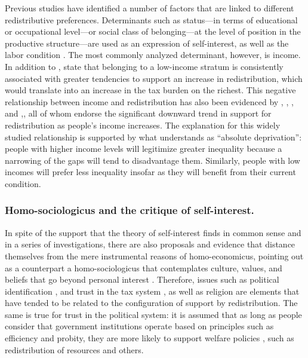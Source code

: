\documentclass[utf8]{frontiersSCNS} %
\begin{document}
Previous studies have identified a number of factors that are linked to different redistributive preferences. Determinants such as status—in terms of educational or occupational level—or social class of belonging—at the level of position in the productive structure—are used as an expression of self-interest, as well as the labor condition \parencite{GijsbertsLegitimationIncomeInequality2002}. The most commonly analyzed determinant, however, is income. In addition to \textcite{MeltzerRationalTheorySize1981}, \textcite{FrankoInequalitySelfInterestPublic2013} state that belonging to a low-income stratum is consistently associated with greater tendencies to support an increase in redistribution, which would translate into an increase in the tax burden on the richest. This negative relationship between income and redistribution has also been evidenced by \textcite{BernasconiRedistributivetaxationdemocracies2006}, \textcite{IversenCapitalismDemocracyWelfare2005}, \textcite{JaegerWelfarestateregimes2005, JaegerWelfareRegimesAttitudes2006}, and \textcite{FinseraasIncomeInequalityDemand2009},, all of whom endorse the significant downward trend in support for redistribution as people’s income increases. The explanation for this widely studied relationship is supported by what \textcite{SzirmaiInequalityobserved1986} understands as “absolute deprivation”: people with higher income levels will legitimize greater inequality because a narrowing of the gaps will tend to disadvantage them. Similarly, people with low incomes will prefer less inequality insofar as they will benefit from their current condition.

\subsubsection{Homo-sociologicus and the critique of self-interest.}

In spite of the support that the theory of self-interest finds in common sense and in a series of investigations, there are also proposals and evidence that distance themselves from the mere instrumental reasons of homo-economicus, pointing out as a counterpart a homo-sociologicus that contemplates culture, values, and beliefs that go beyond personal interest \parencite{etzioni1988moral, FeldmanPoliticalCultureAmbivalence1992}. Therefore, issues such as political identification \parencite{CastilloClivajespartidarioscambios2013}, and trust in the tax system \parencite{AlmCultureDifferencesTax2006}, as well as religion \parencite{ScheveReligionPreferencesSocial2006} are elements that have tended to be related to the configuration of support by redistribution. The same is true for trust in the political system: it is assumed that as long as people consider that government institutions operate based on principles such as efficiency and probity, they are more likely to support welfare policies \parencite{KumlinPersonalPolitical2004}, such as redistribution of resources and others.
\end{document}
